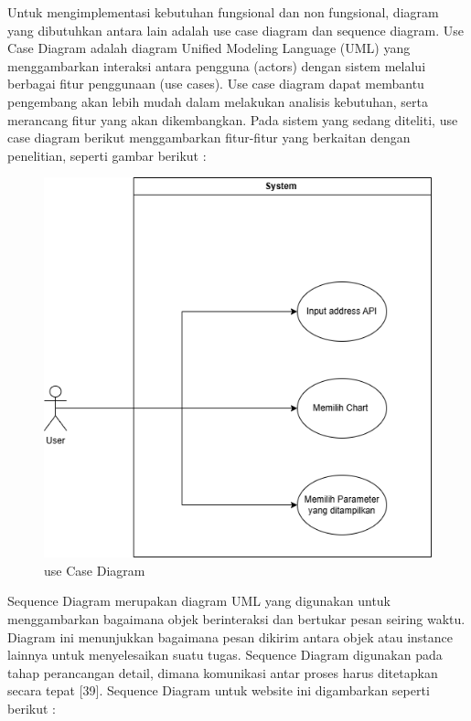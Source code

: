 Untuk mengimplementasi kebutuhan fungsional dan non fungsional, diagram yang dibutuhkan antara lain adalah use case diagram dan sequence diagram. Use Case Diagram adalah diagram Unified Modeling Language (UML) yang menggambarkan interaksi antara pengguna (actors) dengan sistem melalui berbagai fitur penggunaan (use cases). Use case diagram dapat membantu pengembang akan lebih mudah dalam melakukan analisis kebutuhan, serta merancang fitur yang akan dikembangkan. Pada sistem yang sedang diteliti, use case diagram berikut menggambarkan fitur-fitur yang berkaitan dengan penelitian, seperti gambar berikut :

\begin{figure}[H]
	\centering
	\includegraphics[width=0.8\linewidth]{gambar/Metodologi/Use Case.png}
	\caption{use Case Diagram}
	\label{Use Case Diagram}
\end{figure}

Sequence Diagram merupakan diagram UML yang digunakan untuk menggambarkan bagaimana objek berinteraksi dan bertukar pesan seiring waktu. Diagram ini menunjukkan bagaimana pesan dikirim antara objek atau instance lainnya untuk menyelesaikan suatu tugas. Sequence Diagram digunakan pada tahap perancangan detail, dimana komunikasi antar proses harus ditetapkan secara tepat [39].  Sequence Diagram untuk website ini digambarkan seperti berikut :

